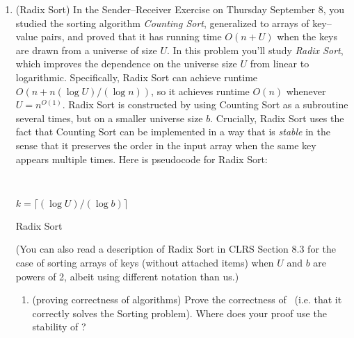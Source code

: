 \documentclass[11pt]{article}
\begin{document}
\begin{enumerate}
\begin{enumerate}
\end{enumerate}
\newpage

\item (Radix Sort) In the Sender--Receiver Exercise on Thursday September 8, you studied the sorting algorithm {\em Counting Sort}, generalized to arrays of key--value pairs, and proved that it has running time $O(n+U)$ when the keys are drawn from a universe of size $U$. In this problem you'll study {\em Radix Sort}, which improves the dependence on the universe size $U$ from linear to logarithmic.  Specifically, Radix Sort can achieve runtime $O(n+n(\log U)/(\log n))$, so it achieves runtime $O(n)$ whenever $U = n^{O(1)}$.  
Radix Sort is constructed by using Counting Sort as a subroutine several times, but on a smaller universe size $b$.
Crucially, Radix Sort uses the fact that Counting Sort can be implemented in a way that is {\em stable} in the sense that it preserves the order in the input array when the same key appears multiple times.  Here is pseudocode for Radix Sort:

\begin{algorithm}[H]
\\

$k=\lceil (\log U)/(\log b)\rceil$\;
\caption{Radix Sort}
\end{algorithm}

(You can also read a description of Radix Sort in CLRS Section 8.3 for the case of sorting arrays of keys (without attached items) when $U$ and $b$ are powers of 2, albeit using different notation than us.)

        \begin{enumerate}
        
            \item (proving correctness of algorithms) Prove the correctness of \RadixSort\ (i.e. that it correctly solves the Sorting problem).  Where does your proof use the stability of \CountingSort?
      

\end{enumerate}
\end{enumerate}
\end{document}
